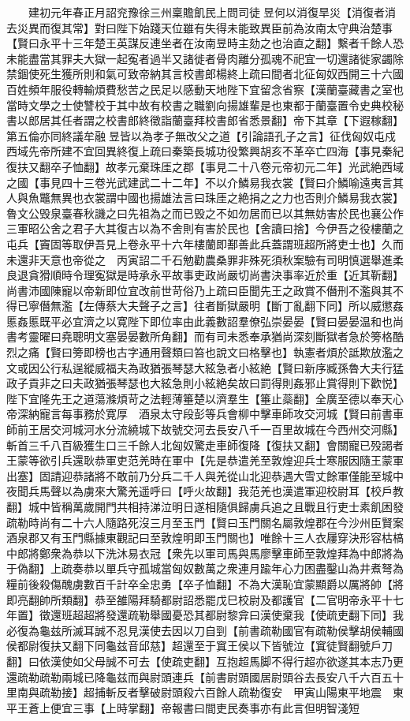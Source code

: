 　　建初元年春正月詔兖豫徐三州稟贍飢民上問司徒昱何以消復旱災【消復者消去災異而復其常】對曰陛下始踐天位雖有失得未能致異臣前為汝南太守典治楚事【賢曰永平十三年楚王英謀反連坐者在汝南昱時主劾之也治直之翻】繫者千餘人恐未能盡當其罪夫大獄一起寃者過半又諸徙者骨肉離分孤魂不祀宜一切還諸徙家蠲除禁錮使死生獲所則和氣可致帝納其言校書郎楊終上疏曰間者北征匈奴西開三十六國百姓頻年服役轉輸煩費愁苦之民足以感動天地陛下宜留念省察【漢蘭臺藏書之室也當時文學之士使讐校于其中故有校書之職劉向揚雄輩是也東都于蘭臺置令史典校秘書以郎居其任者謂之校書郎終徵詣蘭臺拜校書郎省悉景翻】帝下其章【下遐稼翻】第五倫亦同終議牟融昱皆以為孝子無改父之道【引論語孔子之言】征伐匈奴屯戍西域先帝所建不宜回異終復上疏曰秦築長城功役繁興胡亥不革卒亡四海【事見秦紀復扶又翻卒子恤翻】故孝元棄珠厓之郡【事見二十八卷元帝初元二年】光武絶西域之國【事見四十三卷光武建武二十二年】不以介鱗易我衣裳【賢曰介鱗喻遠夷言其人與魚鼈無異也衣裳謂中國也揚雄法言曰珠厓之絶捐之之力也否則介鱗易我衣裳】魯文公毁泉臺春秋譏之曰先祖為之而已毁之不如勿居而已以其無妨害於民也襄公作三軍昭公舍之君子大其復古以為不舍則有害於民也【舍讀曰捨】今伊吾之役樓蘭之屯兵【竇固等取伊吾見上卷永平十六年樓蘭即鄯善此兵蓋謂班超所將吏士也】久而未還非天意也帝從之　丙寅詔二千石勉勸農桑罪非殊死須秋案驗有司明慎選舉進柔良退貪猾順時令理寃獄是時承永平故事吏政尚嚴切尚書決事率近於重【近其靳翻】尚書沛國陳寵以帝新即位宜改前世苛俗乃上疏曰臣聞先王之政賞不僭刑不濫與其不得已寧僭無濫【左傳蔡大夫聲子之言】往者斷獄嚴明【斷丁亂翻下同】所以威懲姦慝姦慝既平必宜濟之以寛陛下即位率由此義數詔羣僚弘崇晏晏【賢曰晏晏温和也尚書考靈曜曰堯聰明文塞晏晏數所角翻】而有司未悉奉承猶尚深刻斷獄者急於篣格酷烈之痛【賢曰篣即榜也古字通用聲類曰笞也說文曰格擊也】執憲者煩於詆欺放濫之文或因公行私逞縱威福夫為政猶張琴瑟大絃急者小絃絶【賢曰新序臧孫魯大夫行猛政子貢非之曰夫政猶張琴瑟也大絃急則小絃絶矣故曰罰得則姦邪止賞得則下歡悦】陛下宜隆先王之道蕩滌煩苛之法輕薄箠楚以濟羣生【箠止蘂翻】全廣至德以奉天心帝深納寵言每事務於寛厚　酒泉太守段彭等兵會柳中擊車師攻交河城【賢曰前書車師前王居交河城河水分流繞城下故號交河去長安八千一百里故城在今西州交河縣】斬首三千八百級獲生口三千餘人北匈奴驚走車師復降【復扶又翻】會關寵已殁謁者王蒙等欲引兵還耿恭軍吏范羌時在軍中【先是恭遣羌至敦煌迎兵士寒服因隨王蒙軍出塞】固請迎恭諸將不敢前乃分兵二千人與羌從山北迎恭遇大雪丈餘軍僅能至城中夜聞兵馬聲以為虜來大驚羌遥呼曰【呼火故翻】我范羌也漢遣軍迎校尉耳【校戶教翻】城中皆稱萬歲開門共相持涕泣明日遂相隨俱歸虜兵追之且戰且行吏士素飢困發疏勒時尚有二十六人隨路死沒三月至玉門【賢曰玉門關名屬敦煌郡在今沙州臣賢案酒泉郡又有玉門縣據東觀記曰至敦煌明即玉門關也】唯餘十三人衣屨穿決形容枯槁中郎將鄭衆為恭以下洗沐易衣冠【衆先以軍司馬與馬廖擊車師至敦煌拜為中郎將為于偽翻】上疏奏恭以單兵守孤城當匈奴數萬之衆連月踰年心力困盡鑿山為井煮弩為糧前後殺傷醜虜數百千計卒全忠勇【卒子恤翻】不為大漢恥宜蒙顯爵以厲將帥【將即亮翻帥所類翻】恭至雒陽拜騎都尉詔悉罷戊巳校尉及都護官【二官明帝永平十七年置】徵還班超超將發還疏勒舉國憂恐其都尉黎弇曰漢使棄我【使疏吏翻下同】我必復為龜兹所滅耳誠不忍見漢使去因以刀自剄【前書疏勒國官有疏勒侯擊胡侯輔國侯都尉復扶又翻下同龜兹音邱慈】超還至于窴王侯以下皆號泣【窴徒賢翻號戶刀翻】曰依漢使如父母誠不可去【使疏吏翻】互抱超馬脚不得行超亦欲遂其本志乃更還疏勒疏勒兩城已降龜兹而與尉頭連兵【前書尉頭國居尉頭谷去長安八千六百五十里南與疏勒接】超捕斬反者擊破尉頭殺六百餘人疏勒復安　甲寅山陽東平地震　東平王蒼上便宜三事【上時掌翻】帝報書曰間吏民奏事亦有此言但明智淺短